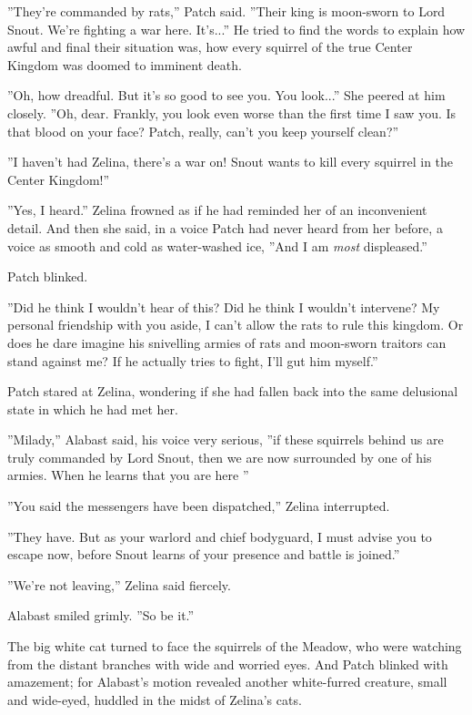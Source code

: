 \documentclass[12pt]{book}
\begin{document}
''They're commanded by rats,'' Patch said. ''Their king is moon-sworn to Lord Snout. We're fighting a war here. It's...'' He tried to find the words to explain how awful and final their situation was, how every squirrel of the true Center Kingdom was doomed to imminent death.

''Oh, how dreadful. But it's so good to see you. You look...'' She peered at him closely. ''Oh, dear. Frankly, you look even worse than the first time I saw you. Is that blood on your face? Patch, really, can't you keep yourself clean?''

''I haven't had %
Zelina, there's a war on! Snout wants to kill every squirrel in the Center Kingdom!''

''Yes, I heard.'' Zelina frowned as if he had reminded her of an inconvenient detail. And then she said, in a voice Patch had never heard from her before, a voice as smooth and cold as water-washed ice, ''And I am {\it most} displeased.''

Patch blinked.

''Did he think I wouldn't hear of this? Did he think I wouldn't intervene? My personal friendship with you aside, I can't allow the rats to rule this kingdom. Or does he dare imagine his snivelling armies of rats and moon-sworn traitors can stand against me? If he actually tries to fight, I'll gut him myself.''

Patch stared at Zelina, wondering if she had fallen back into the same delusional state in which he had met her.

''Milady,'' Alabast said, his voice very serious, ''if these squirrels behind us are truly commanded by Lord Snout, then we are now surrounded by one of his armies. When he learns that you are here %
''

''You said the messengers have been dispatched,'' Zelina interrupted.

''They have. But as your warlord and chief bodyguard, I must advise you to escape now, before Snout learns of your presence and battle is joined.''

''We're not leaving,'' Zelina said fiercely.

Alabast smiled grimly. ''So be it.''

The big white cat turned to face the squirrels of the Meadow, who were watching from the distant branches with wide and worried eyes. And Patch blinked with amazement; for Alabast's motion revealed another white-furred creature, small and wide-eyed, huddled in the midst of Zelina's cats.
\end{document}
